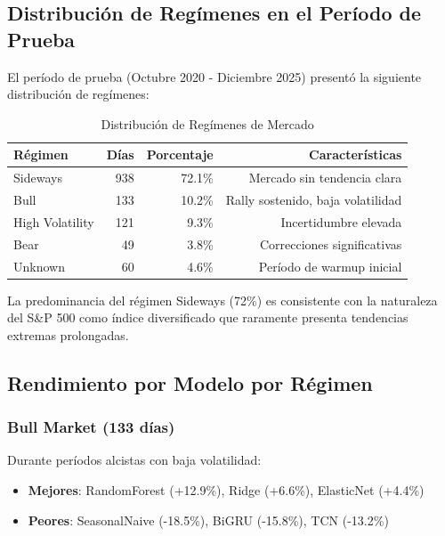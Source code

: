 \subsection{Distribuci\'on de Reg\'imenes en el Per\'iodo de Prueba}
\label{subsec:regime_distribution}

El per\'iodo de prueba (Octubre 2020 - Diciembre 2025) present\'o la siguiente distribuci\'on de reg\'imenes:

\begin{table}[htbp]
\centering
\caption{Distribuci\'on de Reg\'imenes de Mercado}
\label{tab:regime_distribution}
\begin{tabular}{@{}lrrr@{}}
\toprule
\textbf{R\'egimen} & \textbf{D\'ias} & \textbf{Porcentaje} & \textbf{Caracter\'isticas} \\
\midrule
Sideways & 938 & 72.1\% & Mercado sin tendencia clara \\
Bull & 133 & 10.2\% & Rally sostenido, baja volatilidad \\
High Volatility & 121 & 9.3\% & Incertidumbre elevada \\
Bear & 49 & 3.8\% & Correcciones significativas \\
Unknown & 60 & 4.6\% & Per\'iodo de warmup inicial \\
\bottomrule
\end{tabular}
\end{table}

La predominancia del r\'egimen Sideways (72\%) es consistente con la naturaleza del S\&P 500 como \'indice diversificado que raramente presenta tendencias extremas prolongadas.

\subsection{Rendimiento por Modelo por R\'egimen}
\label{subsec:regime_performance}

\subsubsection{Bull Market (133 d\'ias)}

Durante per\'iodos alcistas con baja volatilidad:

\begin{itemize}
    \item \textbf{Mejores}: RandomForest (+12.9\%), Ridge (+6.6\%), ElasticNet (+4.4\%)
    \item \textbf{Peores}: SeasonalNaive (-18.5\%), BiGRU (-15.8\%), TCN (-13.2\%)
\end{itemize}

